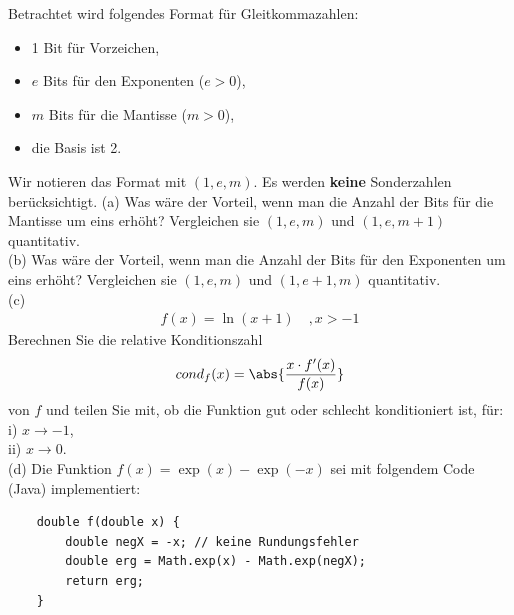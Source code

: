 \documentclass{scrartcl}
\begin{document}
	Betrachtet wird folgendes Format für Gleitkommazahlen:
	\begin{itemize}
		\item 1 Bit für Vorzeichen,
		\item $e$ Bits für den Exponenten ($e > 0$),
		\item $m$ Bits für die Mantisse ($m > 0$),
		\item die Basis ist 2.
	\end{itemize}
	Wir notieren das Format mit $(1,e,m)$. Es werden \textbf{keine} Sonderzahlen berücksichtigt.
	\n
	(a) 
	Was wäre der Vorteil, wenn man die Anzahl der Bits für die Mantisse um eins erhöht? Vergleichen sie $(1,e,m)$ und $(1,e,m+1)$ quantitativ.
	\lbreak \lbreak \lbreak
	\\
	(b) 
	Was wäre der Vorteil, wenn man die Anzahl der Bits für den Exponenten um eins erhöht? Vergleichen sie $(1,e,m)$ und $(1,e+1,m)$ quantitativ.
	\n 
	\lbreak \lbreak \lbreak
	\\
	(c) 
	\begin{align*}
		f(x) = \ln (x+1) \quad, x > -1
	\end{align*}
	Berechnen Sie die relative Konditionszahl
	\begin{align*}
		cond_f(x) = \abs{\frac{x \cdot f'(x)}{f(x)}}
	\end{align*}
	von $f$ und teilen Sie mit, ob die Funktion gut oder schlecht konditioniert ist, für:
	\\i) $x \longrightarrow -1$,
	\\ii) $x \longrightarrow 0$.
	\n 
	\lbreak \lbreak \lbreak
	\\
	(d)
	Die Funktion $f(x) = \exp(x) - \exp(-x)$ sei mit folgendem Code (Java) implementiert:
	\begin{lstlisting}
	double f(double x) {
		double negX = -x; // keine Rundungsfehler
		double erg = Math.exp(x) - Math.exp(negX);
		return erg;
	}
	\end{lstlisting}
	
\end{document}
